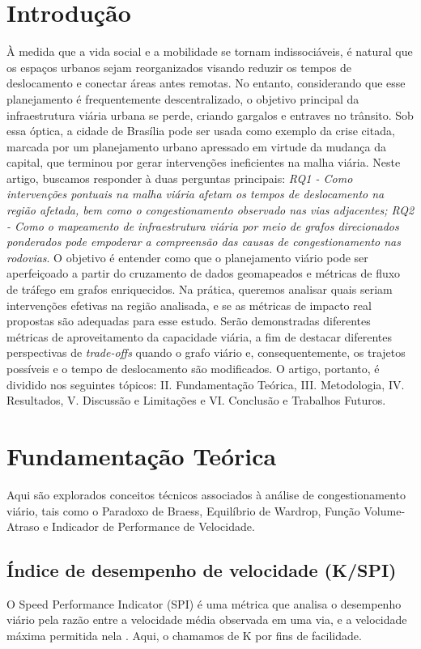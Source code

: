\documentclass[portuguese]{sbc2025}%
\begin{document}
\section{Introdução}
\label{sec:intro}

À medida que a vida social e a mobilidade se tornam indissociáveis, é natural que os espaços urbanos sejam reorganizados visando reduzir os tempos de deslocamento e conectar áreas antes remotas. No entanto, considerando que esse planejamento é frequentemente descentralizado, o objetivo principal da infraestrutura viária urbana se perde, criando gargalos e entraves no trânsito. Sob essa óptica, a cidade de Brasília pode ser usada como exemplo da crise citada, marcada por um planejamento urbano apressado em virtude da mudança da capital, que terminou por gerar intervenções ineficientes na malha viária. Neste artigo, buscamos responder à duas perguntas principais: \textit{RQ1 - Como intervenções pontuais na malha viária afetam os tempos de deslocamento na região afetada, bem como o congestionamento observado nas vias adjacentes; RQ2 - Como o mapeamento de infraestrutura viária por meio de grafos direcionados ponderados pode empoderar a compreensão das causas de congestionamento nas rodovias}. O objetivo é entender como que o planejamento viário pode ser aperfeiçoado a partir do cruzamento de dados geomapeados e métricas de fluxo de tráfego em grafos enriquecidos. Na prática, queremos analisar quais seriam intervenções efetivas na região analisada, e se as métricas de impacto real propostas são adequadas para esse estudo. Serão demonstradas diferentes métricas de aproveitamento da capacidade viária, a fim de destacar diferentes perspectivas de \textit{trade-offs} quando o grafo viário e, consequentemente, os trajetos possíveis e o tempo de deslocamento são modificados. O artigo, portanto, é dividido nos seguintes tópicos: II. Fundamentação Teórica, III. Metodologia, IV. Resultados, V. Discussão e Limitações e VI. Conclusão e Trabalhos Futuros.
 
\section{Fundamentação Teórica}
Aqui são explorados conceitos técnicos associados à análise de congestionamento viário, tais como o Paradoxo de Braess, Equilíbrio de Wardrop, Função Volume-Atraso e Indicador de Performance de Velocidade.

\subsection{Índice de desempenho de velocidade (K/SPI)}
O Speed Performance Indicator (SPI) é uma métrica que analisa o desempenho viário pela razão entre a velocidade média observada em uma via, e a velocidade máxima permitida nela \cite{he2016spi}. Aqui, o chamamos de K por fins de facilidade.
\end{document}
